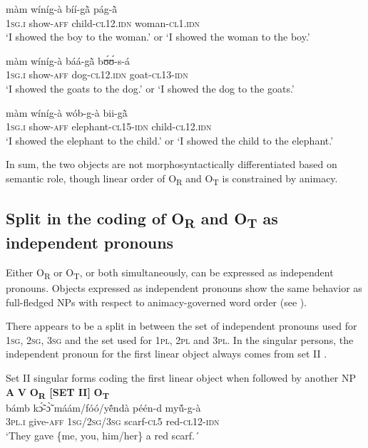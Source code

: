 \documentclass[output=paper]{langsci/langscibook}
\begin{document}
\ea
\label{ex:16.pacchiarotti}
\gll màm    wíníg-à    bíí-g\`{ã}      pág-\`{ã} \\
\textsc{1sg.i}    show-\textsc{aff}    child-\textsc{cl12.idn}  woman-\textsc{cl1.idn}\\
\glt`I showed the boy to the woman.' or `I showed the woman to the boy.'
\z

\ea
\label{ex:17.pacchiarotti}
\gll màm    wíníg-à    báá-g\`{ã}    bʊ́ʊ́-s-á \\
\textsc{1sg.i}    show-\textsc{aff}    dog-\textsc{cl12.idn}  goat-\textsc{cl13-idn}\\
\glt`I showed the goats to the dog.' or `I showed the dog to the goats.'  
\z

\ea
\label{ex:18.pacchiarotti}
\gll màm    wíníg-à    wób-g-à    bii-g\`{ã} \\
\textsc{1sg.i}    show-\textsc{aff}    elephant-\textsc{cl15-idn}  child-\textsc{cl12.idn}\\
\glt `I showed the elephant to the child.' or `I showed the child to the elephant.'
\z

In sum, the two objects are not morphosyntactically differentiated based on semantic role, though linear order of O\textsubscript{R} and O\textsubscript{T} is constrained by animacy.

\subsection{Split in the coding of O\textsubscript{R} and O\textsubscript{T} as independent pronouns}\label{§4.3:split.pacchiarotti}

Either O\textsubscript{R} or O\textsubscript{T}, or both simultaneously, can be expressed as independent pronouns. Objects expressed as independent pronouns show the same behavior as full-fledged NPs with respect to animacy-governed word order (see ). 

There appears to be a split in  between the set of independent pronouns used for 1\textsc{sg}, 2\textsc{sg}, 3\textsc{sg} and the set used for 1\textsc{pl}, 2\textsc{pl} and 3\textsc{pl}. In the singular persons, the independent pronoun for the first linear object always comes from set II . 

\newpage
\ea\label{ex:fig:1.pacchiarotti}
{  Set II singular forms coding the first linear object when followed by another NP} \\
\glll  
\textbf{A}  \textbf{V}  \textbf{O\textsubscript{R} [SET II]}  \textbf{O\textsubscript{T}} \\
		  bámb  k\'{\~ɔ}-\`{\~ɔ}    máám/fóó/{y\'{\~e}ndà}    péén-d  my\'{\~u}-g-à \\
		  3\textsc{pl.i}   give-\textsc{aff}   1\textsc{sg}/2\textsc{sg}/3\textsc{sg}  scarf-\textsc{cl}5   red-\textsc{cl}12-\textsc{idn}\\
	\glt `They gave \{me, you, him\slash her\} a red scarf.´
\z    
\end{document}
